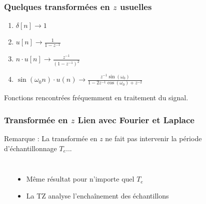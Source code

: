 \documentclass{beamer}
\begin{document}
\begin{frame}
\frametitle{Quelques transformées en $z$ usuelles}

\begin{enumerate}
\item $\delta[n] \rightarrow  1$ 
\vspace{0.3cm}
\item $u[n] \rightarrow \frac{\displaystyle 1}{ \displaystyle 1-z^{-1}}$
\vspace{0.3cm}
\item $n \cdot u[n] \rightarrow \frac{\displaystyle z^{-1}}{\displaystyle (1-z^{-1})^2} $
\vspace{0.3cm}
\item $\sin(\omega_0 n) \cdot u(n) \rightarrow  \frac{\displaystyle z^{-1} \sin(\omega_0)}{\displaystyle 1-2z^{-1} \cos(\omega_0) +z^{-2}} $
\end{enumerate} 
\vspace{0.5cm}

Fonctions rencontrées fréquemment en traitement du signal.

\end{frame}

\begin{frame}
\frametitle{Transformée en $z$ Lien avec Fourier et Laplace}

Remarque : La transformée en $z$ ne fait pas intervenir la période d'échantillonnage $T_e$...\\
\begin{columns}
\column{60mm}
\begin{center}
\end{center}
\column{60mm}
\begin{itemize}
\item Même résultat pour n'importe quel $T_e$
\vspace{0.3cm}
\item La TZ analyse l'enchaînement des échantillons
\end{itemize}

\end{columns}
\end{frame}
\end{document}

